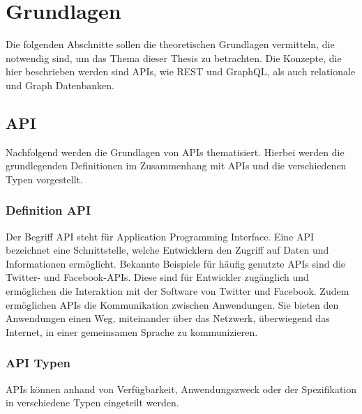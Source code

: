\chapter{Grundlagen} %
\label{sec:grundlagen}
Die folgenden Abschnitte sollen die theoretischen Grundlagen vermitteln, die notwendig sind, um das Thema dieser Thesis zu betrachten. Die Konzepte, die hier beschrieben werden sind APIs, wie REST und GraphQL, als auch relationale und Graph Datenbanken.
\section{API} %
\label{sec:apigrundlagen}
Nachfolgend werden die Grundlagen von APIs thematisiert. Hierbei werden die grundlegenden Definitionen im Zusammenhang mit APIs und die verschiedenen Typen vorgestellt.
\subsection{Definition API} %
\label{sec:grundlegendedefinitionvonapi}
Der Begriff \glqq API\grqq{}  steht für \glqq Application Programming Interface\grqq{}. Eine API bezeichnet eine Schnittstelle, welche Entwicklern den Zugriff auf Daten und Informationen ermöglicht. Bekannte Beispiele für häufig genutzte APIs sind die Twitter- und Facebook-APIs. Diese sind für Entwickler zugänglich und ermöglichen die Interaktion mit der Software von Twitter und Facebook. Zudem ermöglichen APIs die Kommunikation zwischen Anwendungen. Sie bieten den Anwendungen einen Weg, miteinander über das Netzwerk, überwiegend das Internet, in einer gemeinsamen Sprache zu kommunizieren. \citep{apistrategyguide}
\subsection{API Typen} %
\label{sec:apitypen}
APIs können anhand von Verfügbarkeit, Anwendungszweck oder der Spezifikation in verschiedene Typen eingeteilt werden.

